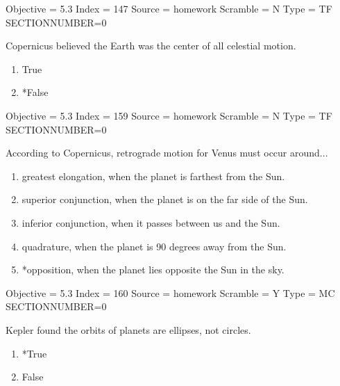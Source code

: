 \documentclass[11pt]{article}
\begin{document}
\begin{enumerate}
\begin{minipage}{\textwidth}
\begin{minipage}{\textwidth}
Objective = 5.3
Index = 147
Source = homework
Scramble = N
Type = TF
SECTIONNUMBER=0
\end{minipage}
\end{minipage}
\vskip 0.20in

\begin{minipage}{\textwidth}
\begin{minipage}{\textwidth}
\item Copernicus believed the Earth was the center of all celestial motion.
\begin{multicols}{3}
\begin{enumerate} 
\setlength{\itemsep}{1pt} 
\setlength{\parskip}{0pt} 
\setlength{\parsep}{0pt}
\setlength{\multicolsep}{1pt} 
\item True
\item *False
\end{enumerate} 
\vfill 
\end{multicols}

Objective = 5.3
Index = 159
Source = homework
Scramble = N
Type = TF
SECTIONNUMBER=0
\end{minipage}
\end{minipage}
\vskip 0.20in

\begin{minipage}{\textwidth}
\begin{minipage}{\textwidth}
\item According to Copernicus, retrograde motion for Venus must occur around...
\begin{enumerate} 
\setlength{\itemsep}{1pt} 
\setlength{\parskip}{0pt} 
\setlength{\parsep}{0pt}
\setlength{\multicolsep}{1pt} 
\item greatest elongation, when the planet is farthest from the Sun.
\item superior conjunction, when the planet is on the far side of the Sun.
\item inferior conjunction, when it passes between us and the Sun.
\item quadrature, when the planet is 90 degrees away from the Sun.
\item *opposition, when the planet lies opposite the Sun in the sky.
\end{enumerate} 
Objective = 5.3
Index = 160
Source = homework
Scramble = Y
Type = MC
SECTIONNUMBER=0
\end{minipage}
\end{minipage}
\vskip 0.20in

\begin{minipage}{\textwidth}
\begin{minipage}{\textwidth}
\item Kepler found the orbits of planets are ellipses, not circles.
\begin{multicols}{3}
\begin{enumerate} 
\setlength{\itemsep}{1pt} 
\setlength{\parskip}{0pt} 
\setlength{\parsep}{0pt}
\setlength{\multicolsep}{1pt} 
\item *True
\item False
\end{enumerate} 
\vfill 
\end{multicols}


\end{minipage}
\end{minipage}
\end{enumerate}
\end{document}
